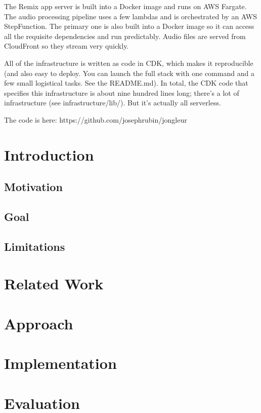 \documentclass{article}
\begin{document}
The Remix app server is built into a Docker image and runs on AWS Fargate.
The audio processing pipeline uses a few lambdas and is orchestrated by an AWS StepFunction.
The primary one is also built into a Docker image so it can access all the requisite dependencies and run predictably.
Audio files are served from CloudFront so they stream very quickly.

All of the infrastructure is written as code in CDK, which makes it reproducible (and also easy to deploy. You can launch the full stack with one command and a few small logistical tasks. See the README.md).
In total, the CDK code that specifies this infrastructure is about nine hundred lines long; there's a lot of infrastructure (see infrastructure/lib/).
But it's actually all serverless.

The code is here: https://github.com/josephrubin/jongleur


\section{Introduction}
\subsection{Motivation} 

\subsection{Goal}

\subsection{Limitations}


\section{Related Work}


\section{Approach} 
\section{Implementation}

\section{Evaluation}
\end{document}
